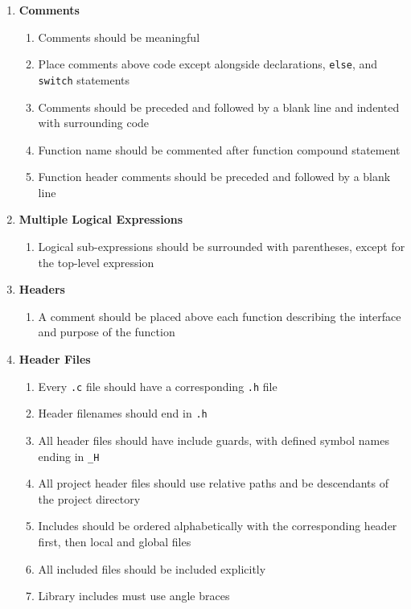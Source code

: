 \documentclass[sigconf]{acmart}
\begin{document}
\begin{enumerate}[label=\Roman*.,ref=\Roman*,]
    \item \textbf{Comments}
    \begin{enumerate}[left=\itemindent,label=\theenumi.\Alph*,ref=\theenumi.\Alph*]
        \item Comments should be meaningful
        \item Place comments above code except alongside declarations, \texttt{else}, and \texttt{switch} statements
        \item Comments should be preceded and followed by a blank line and indented with surrounding code
        \item Function name should be commented after function compound statement
        \item Function header comments should be preceded and followed by a blank line
    \end{enumerate}
    
    \item \textbf{Multiple Logical Expressions}
    \begin{enumerate}[left=\itemindent,label=\theenumi.\Alph*,ref=\theenumi.\Alph*]
        \item Logical sub-expressions should be surrounded with parentheses, except for the top-level expression
    \end{enumerate}
    
    \item \textbf{Headers}
    \begin{enumerate}[left=\itemindent,label=\theenumi.\Alph*,ref=\theenumi.\Alph*]
        \item A comment should be placed above each function describing the interface and purpose of the function
    \end{enumerate}
    
    
    \item \textbf{Header Files}
    \begin{enumerate}[left=\itemindent,label=\theenumi.\Alph*,ref=\theenumi.\Alph*]
        \item Every \texttt{.c} file should have a corresponding \texttt{.h} file
        \item Header filenames should end in \texttt{.h}
        \item All header files should have include guards, with defined symbol names ending in \texttt{\_H}
        \item All project header files should use relative paths and be descendants of the project directory
        \item Includes should be ordered alphabetically with the corresponding header first, then local and global files
        \item All included files should be included explicitly
        \item Library includes must use angle braces
    \end{enumerate}
    

\end{enumerate}
\end{document}
